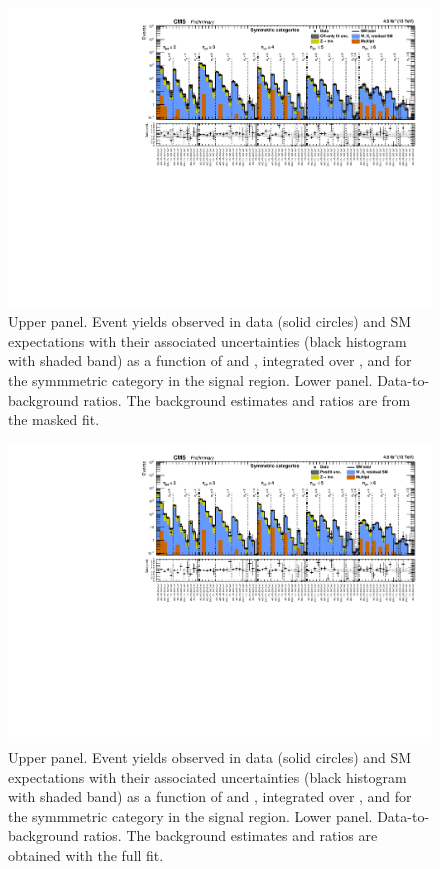 
\clearpage
\begin{figure}[h!]
  \centering
  \caption{Upper panel. Event yields observed in data (solid circles)
    and SM expectations with their associated uncertainties (black
    histogram with shaded band) as a function of \nb and \scalht,
    integrated over \mht, and for the symmmetric \njet category
    in the signal region. Lower panel. Data-to-background ratios. The
    background estimates and ratios are from the masked fit. }
  \label{fig:mr_symm_pre}
  \includegraphics[width=1.\linewidth]{figures/results/symm/summaryPlot_Symmetric_prefit}
\end{figure}

\clearpage
\begin{figure}[h!]
  \centering
  \caption{Upper panel. Event yields observed in data (solid circles)
    and SM expectations with their associated uncertainties (black
    histogram with shaded band) as a function of \nb and \scalht,
    integrated over \mht, and for the symmmetric \njet category
    in the signal region. Lower panel. Data-to-background ratios. The
    background estimates and ratios are obtained with the full fit. }
  \label{fig:mr_symm_post}
  \includegraphics[width=1.\linewidth]{figures/results/symm/summaryPlot_Symmetric_fit_b}
\end{figure}

